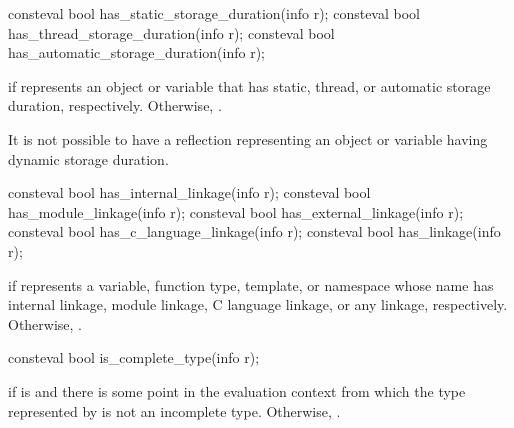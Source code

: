 %
%
%
\begin{itemdecl}
consteval bool has_static_storage_duration(info r);
consteval bool has_thread_storage_duration(info r);
consteval bool has_automatic_storage_duration(info r);
\end{itemdecl}

\begin{itemdescr}
\pnum
\returns
{} if  represents an object or variable that has
static, thread, or automatic storage duration, respectively.
Otherwise, .
\begin{note}
It is not possible to have a reflection
representing an object or variable having dynamic storage duration.
\end{note}
\end{itemdescr}

%
%
%
%
%
\begin{itemdecl}
consteval bool has_internal_linkage(info r);
consteval bool has_module_linkage(info r);
consteval bool has_external_linkage(info r);
consteval bool has_c_language_linkage(info r);
consteval bool has_linkage(info r);
\end{itemdecl}

\begin{itemdescr}
\pnum
\returns
{} if  represents a variable, function type, template, or namespace
whose name has
internal linkage,
module linkage,
C language linkage, or
any linkage, respectively.
Otherwise, .
\end{itemdescr}

%
\begin{itemdecl}
consteval bool is_complete_type(info r);
\end{itemdecl}

\begin{itemdescr}
\pnum
\returns
{} if  is 
and there is some point in the evaluation context
from which the type represented by 
is not an incomplete type.
Otherwise, .
\end{itemdescr}

